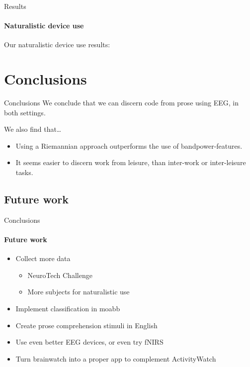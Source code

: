 \documentclass[xcolor={dvipsnames,table},12pt]{beamer}
\begin{document}
\begin{frame}{Results}
    \framesubtitle{Naturalistic device use}
    Our naturalistic device use results:

    \begin{adjustbox}{width=0.8\textwidth, float=table}
        
    \end{adjustbox}
\end{frame}

\section{Conclusions}
\begin{frame}{Conclusions}
    We conclude that we can discern code from prose using EEG, in both settings.

    We also find that\ldots
    \begin{itemize}
        \item Using a Riemannian approach outperforms the use of bandpower-features.
        \item It seems easier to discern work from leisure, than inter-work or inter-leisure tasks.
    \end{itemize}
\end{frame}

\subsection{Future work}
\begin{frame}{Conclusions}
    \framesubtitle{Future work}

    \begin{itemize}
        \item Collect more data
        \begin{itemize}
            \item NeuroTech Challenge
            \item More subjects for naturalistic use
        \end{itemize}
        \item Implement classification in moabb
        \item Create prose comprehension stimuli in English
        \item Use even better EEG devices, or even try fNIRS
        \item Turn brainwatch into a proper app to complement ActivityWatch
    \end{itemize}
\end{frame}
\end{document}
